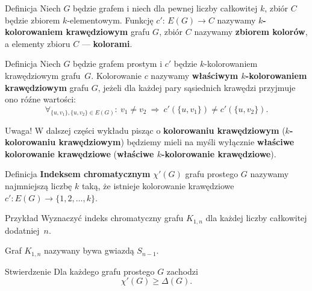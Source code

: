 \documentclass[a4paper,10pt]{beamer}
\begin{document}
\begin{frame}

\begin{block}{Definicja}
 Niech $G$ będzie grafem i niech dla pewnej liczby całkowitej $k$, zbiór $C$ będzie zbiorem $k$-elementowym. Funkcję $c':\,E(G)\to C$ nazywamy {\bf $k$-kolorowaniem krawędziowym} grafu $G$, zbiór $C$ nazywamy {\bf zbiorem kolorów}, a elementy zbioru $C$ --- {\bf kolorami}.
\end{block}

\begin{block}{Definicja}
Niech $G$ będzie grafem prostym i $c'$ będzie $k$-kolorowaniem krawędziowym grafu~$G$. Kolorowanie $c$ nazywamy {\bf właściwym $k$-kolorowaniem krawędziowym} grafu $G$, jeżeli dla każdej pary sąsiednich krawędzi przyjmuje ono róźne wartości:
$$\forall_{\{u,v_1\},\{u,v_2\}\in E(G)}:\ v_1\neq v_2\ \Rightarrow\ c'(\{u,v_1\})\neq c'(\{u,v_2\}).$$
\end{block}

	\begin{alertblock}{Uwaga!}
		W dalszej części wykładu pisząc o {\bf kolorowaniu krawędziowym} ({\bf $k$-kolorowaniu krawędziowym}) będziemy mieli na myśli wyłącznie {\bf właściwe kolorowanie krawędziowe} ({\bf właściwe $k$-kolorowanie krawędziowe}).
	\end{alertblock}

\end{frame}



\begin{frame}
	\begin{block}{Definicja}
		{\bf Indeksem chromatycznym} $\chi'(G)$ grafu prostego $G$ nazywamy najmniejszą liczbę $k$ taką, że istnieje kolorowanie krawędziowe $c':E(G)\to\{1,2,\ldots,k\}$.
	\end{block}

	\begin{exampleblock}{Przykład}
		Wyznaczyć indeks chromatyczny grafu $K_{1,n}$ dla każdej liczby całkowitej dodatniej~$n$.
	\end{exampleblock}

	Graf $K_{1,n}$ nazywany bywa gwiazdą $S_{n-1}$.

	\begin{block}{Stwierdzenie}
		Dla każdego grafu prostego $G$ zachodzi $$\chi'(G)\geqslant\Delta(G).$$
	\end{block}
\end{frame}
\end{document}
